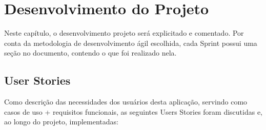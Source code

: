 

\chapter[Desenvolvimento do Projeto]{Desenvolvimento do Projeto}
Neste capítulo, o desenvolvimento projeto será explicitado e comentado. Por conta da metodologia de desenvolvimento ágil escolhida, cada Sprint possui uma seção no documento, contendo o que foi realizado nela.

\section{User Stories}
Como descrição das necessidades dos usuários desta aplicação, servindo como casos de uso + requisitos funcionais, as seguintes Users Stories foram discutidas e, ao longo do projeto, implementadas:

